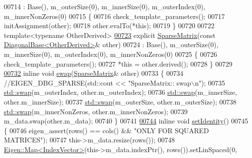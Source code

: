 \begin{DoxyCode}
00714       : Base(), m\_outerSize(0), m\_innerSize(0), m\_outerIndex(0), m\_innerNonZeros(0)
00715     \{
00716       check\_template\_parameters();
00717       initAssignment(other);
00718       other.evalTo(*\textcolor{keyword}{this});
00719     \}
00720     
00722     \textcolor{keyword}{template}<\textcolor{keyword}{typename} OtherDerived>
\hyperlink{group___sparse_core___module_a1c6fde42fd40e6f753b60f71e8fd88aa}{00723}     \textcolor{keyword}{explicit} \hyperlink{group___sparse_core___module_a1c6fde42fd40e6f753b60f71e8fd88aa}{SparseMatrix}(\textcolor{keyword}{const} \hyperlink{class_eigen_1_1_diagonal_base}{DiagonalBase<OtherDerived>}& other)
00724       : Base(), m\_outerSize(0), m\_innerSize(0), m\_outerIndex(0), m\_innerNonZeros(0)
00725     \{
00726       check\_template\_parameters();
00727       *\textcolor{keyword}{this} = other.derived();
00728     \}
00729 
\hyperlink{group___sparse_core___module_ae9b9ad3524f87276511397d988b7a607}{00732}     \textcolor{keyword}{inline} \textcolor{keywordtype}{void} \hyperlink{group___sparse_core___module_ae9b9ad3524f87276511397d988b7a607}{swap}(\hyperlink{group___sparse_core___module_class_eigen_1_1_sparse_matrix}{SparseMatrix}& other)
00733     \{
00734       \textcolor{comment}{//EIGEN\_DBG\_SPARSE(std::cout << "SparseMatrix:: swap\(\backslash\)n");}
00735       \hyperlink{endian_8c_a3ca5ecd34b04d6a243c054ac3a57f68d}{std::swap}(m\_outerIndex, other.m\_outerIndex);
00736       \hyperlink{endian_8c_a3ca5ecd34b04d6a243c054ac3a57f68d}{std::swap}(m\_innerSize, other.m\_innerSize);
00737       \hyperlink{endian_8c_a3ca5ecd34b04d6a243c054ac3a57f68d}{std::swap}(m\_outerSize, other.m\_outerSize);
00738       \hyperlink{endian_8c_a3ca5ecd34b04d6a243c054ac3a57f68d}{std::swap}(m\_innerNonZeros, other.m\_innerNonZeros);
00739       m\_data.swap(other.m\_data);
00740     \}
00741 
\hyperlink{group___sparse_core___module_a89013d2aa58413672c90932607a0d6f0}{00744}     \textcolor{keyword}{inline} \textcolor{keywordtype}{void} \hyperlink{group___sparse_core___module_a89013d2aa58413672c90932607a0d6f0}{setIdentity}()
00745     \{
00746       eigen\_assert(rows() == cols() && \textcolor{stringliteral}{"ONLY FOR SQUARED MATRICES"});
00747       this->m\_data.resize(rows());
00748       \hyperlink{group___core___module_class_eigen_1_1_map}{Eigen::Map<IndexVector>}(this->m\_data.indexPtr(), rows()).setLinSpaced(0, 

\end{DoxyCode}
